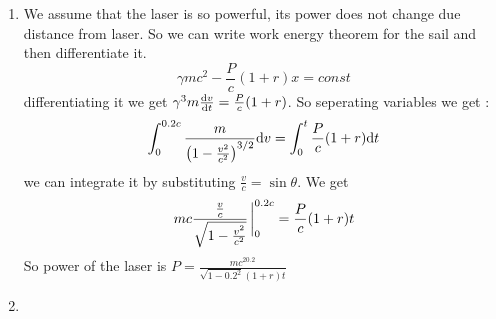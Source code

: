 \begin{sol}
\begin{enumerate}[label=\textbf{(\alph*)}]
\begin{center}
\end{center}
\item
We assume that the laser is so powerful, its power does not change due distance from laser. So we can write work energy theorem for the  sail and then differentiate it. $$\gamma mc^2- \frac{P}{c}(1+r)x=const$$ differentiating it we get $\gamma^3m\dv{v}{t}=\frac{P}{c}(1+r)$. So seperating variables we get :
$$\int_0^{0.2c}\frac{m}{\qty(1-\frac{v^2}{c^2})^{3/2}}\dd v=\int_0^t\frac{P}{c}(1+r)\dd t$$ we can integrate it by substituting $\frac{v}{c}=\sin\theta$. We get 
$$mc\frac{\tfrac{v}{c}}{\sqrt{1-\tfrac{v^2}{c^2}}}\eval_0^{0.2c}=\frac{P}{c}(1+r)t$$
So power of the laser is $P=\frac{mc^20.2}{\sqrt{1-0.2^2}(1+r)t}$
\item
\end{enumerate}
\vspace{15mm}
\end{sol}